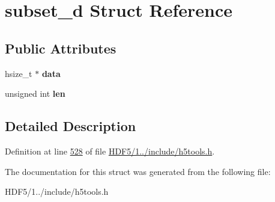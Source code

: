 \hypertarget{structsubset__d}{}\section{subset\+\_\+d Struct Reference}
\label{structsubset__d}
\subsection*{Public Attributes}
\begin{DoxyCompactItemize}
\item 
\mbox{\label{structsubset__d_a22b52e4e3b95b15d18e9d081bcf311c0}} 
hsize\+\_\+t $\ast$ {\bfseries data}
\item 
\mbox{\label{structsubset__d_a6255314cd47e676fada83be657a6ff21}} 
unsigned int {\bfseries len}
\end{DoxyCompactItemize}


\subsection{Detailed Description}


Definition at line \hyperlink{_h_d_f5_21_810_81_2include_2h5tools_8h_source_l00528}{528} of file \hyperlink{_h_d_f5_21_810_81_2include_2h5tools_8h_source}{H\+D\+F5/1../include/h5tools.\+h}.



The documentation for this struct was generated from the following file\+:\begin{DoxyCompactItemize}
\item 
H\+D\+F5/1../include/h5tools.\+h\end{DoxyCompactItemize}
